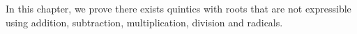 \documentclass[../book.tex]{subfiles}
\begin{document}
In this chapter, we prove there exists quintics
with roots that are not expressible using 
addition, subtraction, multiplication, division and radicals. 







\end{document}
